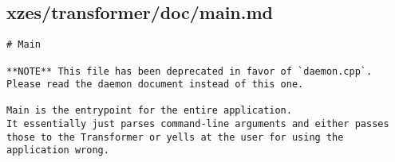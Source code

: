 \subsection{xzes/transformer/doc/main.md}
\begin{lstlisting}
# Main

**NOTE** This file has been deprecated in favor of `daemon.cpp`.
Please read the daemon document instead of this one.

Main is the entrypoint for the entire application.
It essentially just parses command-line arguments and either passes those to the Transformer or yells at the user for using the application wrong.
\end{lstlisting}
